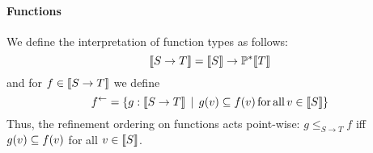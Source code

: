 \documentclass{llncs}
\renewcommand{\leq}{\leqslant}
\begin{document}
\paragraph{Functions}
We define the interpretation of function types as follows:
\[\llbracket S\to T\rrbracket=\llbracket S\rrbracket\to\mathbb{P^*}\llbracket T\rrbracket\]
and for $f\in\llbracket S\to T\rrbracket$ we define
\[f^\leftarrow=\{g:\llbracket S\to T\rrbracket\,\mid\,g(v)\subseteq f(v)\mathrm{\,for\,all\,}v\in\llbracket S\rrbracket\}\]
Thus, the refinement ordering on functions acts point-wise: $g \leq_{S\to T} f$ iff $g(v)\subseteq f(v)$ for all $v\in\llbracket S\rrbracket$.
\end{document}
